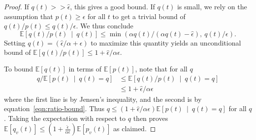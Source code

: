 \documentclass{sig-alternate-dan}
\numberwithin{equation}{section}
\newcommand{\sensor}{\ensuremath{v}}
\newcommand{\mueager}{\ensuremath{\mu_{\text{eager}}}}
\newcommand{\mulazy}{\ensuremath{\mu_{\text{lazy}}}}
\newcommand{\ignore}[1]{}
\newcommand{\paren} [1] {\ensuremath{ \left( {#1} \right) }}
\newcommand{\E}[1]{\ensuremath{\mathbb{E}\left[#1\right] }}
\newcommand{\Econd}[2]{\ensuremath{\mathbb{E}\left[  {#1} \ \middle| \ {#2}\right] }}  %
\newtheorem{theorem}{Theorem}
\begin{document}
{\begin{proof}
If $q(t) >> \hat{\epsilon}$, this gives a good bound.  If $q(t)$ is small, we
rely on the assumption that $p(t) \ge \epsilon$ for all $t$ to get a trivial
bound of $q(t)/p(t) \le q(t)/\epsilon$.
We thus conclude 
\begin{equation} \label{eqn:ratio-bound}
\Econd{q(t)/p(t)}{q(t)} \le \min \paren{\alpha q(t)/(\alpha q(t) - \hat{\epsilon}) ,\ q(t)/\epsilon}\mbox{.}
\end{equation}
Setting $q(t) = (\hat{\epsilon}/\alpha + \epsilon)$ to maximize this
quantity yields an unconditional bound of 
%
%
$\E{q(t)/p(t)} \le 1 + \hat{\epsilon}/\alpha\epsilon$.


To bound $\E{q(t)}$ in terms of $\E{p(t)}$, note that for all $q$
\begin{align*}
q/\Econd{p(t)}{q(t)=q} & \le \Econd{q(t)/p(t)}{q(t)=q}\\
                    & \le 1 + \hat{\epsilon}/\alpha\epsilon
\end{align*}
where the first line is by Jensen's inequality, and the second is by 
equation~\ref{eqn:ratio-bound}.
Thus $q \le \paren{1 +
  \hat{\epsilon}/\alpha\epsilon}\Econd{p(t)}{q(t)=q}$ for all $q$.
Taking the expectation with respect to $q$ then proves 
$\E{q_{\sensor}(t)} \le \paren{1 +
  \frac{\hat{\epsilon}}{\alpha\epsilon}} \E{p_{\sensor}(t)}$
as claimed.
\end{proof}

\ignore{
%
%
\begin{theorem}
Say a sensor \emph{activates} in any round in which it sends a message
to the server.  Under the above assumptions on $p_{\sensor}(t)$, for
any sensor $\sensor$ the expected time $\mueager$ between sensor
activations with renormalization on each round is at most $(1 +
\hat{\epsilon}/\epsilon)$ times the expected time $\mulazy$ between
sensor activations with lazy renormalization.
\end{theorem}

}}
\end{document}
